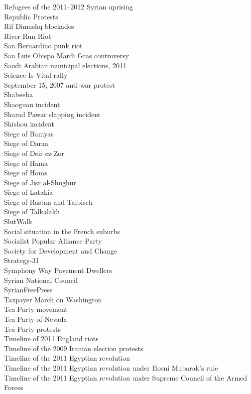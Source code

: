 Refugees of the 2011–2012 Syrian uprising\\
Republic Protests\\
Rif Dimashq blockades\\
River Run Riot\\
San Bernardino punk riot\\
San Luis Obispo Mardi Gras controversy\\
Saudi Arabian municipal elections, 2011\\
Science Is Vital rally\\
September 15, 2007 anti-war protest\\
Shabeeha\\
Shaoguan incident\\
Sharad Pawar slapping incident\\
Shishou incident\\
Siege of Baniyas\\
Siege of Daraa\\
Siege of Deir ez-Zor\\
Siege of Hama\\
Siege of Homs\\
Siege of Jisr al-Shughur\\
Siege of Latakia\\
Siege of Rastan and Talbiseh\\
Siege of Talkalakh\\
SlutWalk\\
Social situation in the French suburbs\\
Socialist Popular Alliance Party\\
Society for Development and Change\\
Strategy-31\\
Symphony Way Pavement Dwellers\\
Syrian National Council\\
SyrianFreePress\\
Taxpayer March on Washington\\
Tea Party movement\\
Tea Party of Nevada\\
Tea Party protests\\
Timeline of 2011 England riots\\
Timeline of the 2009 Iranian election protests\\
Timeline of the 2011 Egyptian revolution\\
Timeline of the 2011 Egyptian revolution under Hosni Mubarak's rule\\
Timeline of the 2011 Egyptian revolution under Supreme Council of the Armed Forces\\
